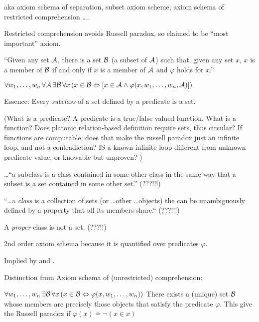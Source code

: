 aka axiom schema of separation, subset axiom scheme,
axiom schema of restricted comprehension \ldots .

Restricted comprehension avoids Russell paradox,
so claimed to be ``most important'' axiom.

``Given any set $\mathcal{A}$, there is a set $\mathcal{B}$
 (a subset of $\mathcal{A}$) 
such that, given any set $x$, 
$x$ is a member of $\mathcal{B}$ if and only if $x$ 
is a member of $\mathcal{A}$ 
and $\varphi$ holds for $x$.''
\cite{wiki:Axiom_schema_of_specification}

${\displaystyle 
\forall w_{1},\ldots ,w_{n}\,
\forall \mathcal{A}\,\exists \mathcal{B}\,
\forall x\,
(x\in \mathcal{B}
\Leftrightarrow
[x\in \mathcal{A}\land \varphi (x,w_{1},\ldots ,w_{n},\mathcal{A})])}$

Essence:
Every \textsl{subclass}
of a set defined by a predicate is a set.

(What is a predicate?
A predicate is a true/false valued function.
What is a function? 
Does platonic relation-based definition require sets,
thus circular?
If functions are computable, does that make the
russell paradox just an infinite loop,
and not a contradiction?
IS a known infinite loop different from 
unknown predicate value, or knowable but unproven?
)

\ldots``a subclass is a class contained in some other class in 
the same way that a subset is a set contained in some other set.''
\cite{wiki:Subclass_set_theory}
(???!!!)

``\dots a \textsl{class} is a collection of sets 
(or \ldots other \ldots objects)
the can be unambiguously defined by a property 
that all its members share.``\cite{wiki:Class_set_theory}
(???!!!)

A \textsl{proper} class is not a set. (???!!)

2nd order axiom schema because it is quantified over predicates
 $\varphi$.

Implied by 
and \cite{wiki:Axiom_of_empty_set}.

Distinction from Axiom schema of (unrestricted) comprehension:

$\forall w_1,\ldots,w_n \, \exists \mathcal{B} \, 
\forall x \, ( x \in \mathcal{B} 
\Leftrightarrow \varphi(x, w_1, \ldots, w_n) )$
There exists a (unique) set $\mathcal{B}$ 
whose members are precisely those objects 
that satisfy the predicate $\varphi$.
This give the Russell paradox if 
$\varphi(x) \doteq \neg(x \in x)$

\label{sec:Axiom-of-pairing}

